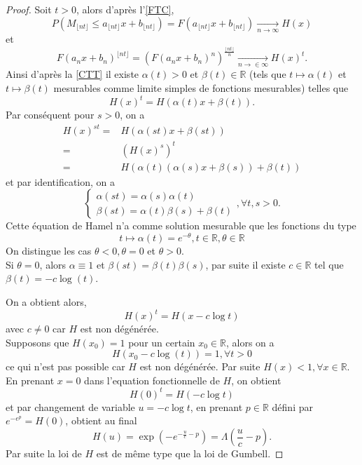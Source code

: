 \documentclass[10p,a4paper,reqno,titlepage]{report}
\newcommand{\R}{\mathbb{R}}
\theoremstyle{plain}
\theoremstyle{definition}
\begin{document}
\begin{proof}
	Soit $t >0$, alors d'après l'\autoref{FTC},
	$$P(M_{\lfloor nt \rfloor} \leq a_{\lfloor nt \rfloor} x + b_{\lfloor nt \rfloor}) = F(a_{\lfloor nt \rfloor} x + b_{\lfloor nt \rfloor}) \underset{n\to \infty}{\longrightarrow} H(x)$$
	et
	$$F(a_n x +b_n)^{\lfloor nt \rfloor} = \left( F(a_n x +b_n)^n\right)^{\frac{\lfloor nt \rfloor}{n}} \underset{n\to\in\infty}{\longrightarrow} H(x)^t.$$
	Ainsi d'après la \autoref{CTT} il existe $\alpha(t)>0$ et $\beta(t)\in\R$ (tels que $t \mapsto \alpha(t)$ et $t \mapsto \beta(t)$ mesurables comme limite simples de fonctions mesurables) telles que 
	$$ H(x)^t = H(\alpha(t)x +\beta(t)).$$
	Par conséquent pour $s>0$, on a 
	\begin{align*}
		H(x)^{st} = &  H(\alpha(st)x + \beta(st))\\
		= & (H(x)^s )^t \\
		= & H(\alpha(t)(\alpha(s)x +\beta(s))+\beta(t))
	\end{align*}
et par identification, on a 
$$\left\{ \begin{array}{l}
	\alpha(st) = \alpha(s)\alpha(t)\\
	\beta(st)= \alpha(t)\beta(s)+\beta(t)
\end{array}\right. ,\forall t,s >0.$$
Cette équation de Hamel n'a comme solution mesurable que les fonctions du type
$$ t \mapsto \alpha(t)= e^{-\theta}, t \in \R, \theta\in\R$$
On distingue les cas $\theta<0, \theta =0$ et $\theta >0$. \\
Si $\theta =0$, alors $\alpha \equiv 1$ et $\beta(st)=\beta(t)\beta(s)$, par suite il existe $c \in\R$ tel que $\beta(t)=- c \log(t)$.

On a obtient alors,
$$ H(x)^t = H(x -c\log t )$$
avec $c \neq 0$ car $H$ est non dégénérée. \\
Supposons que $H(x_0)= 1 $ pour un certain $x_0 \in \R$, alors on a 
 $$ H(x_0 - c\log(t))= 1 ,\forall t > 0$$
 ce qui n'est pas possible car $H$ est non dégénérée. Par suite $H(x) < 1,\forall x \in \R$.\\
 En prenant $x=0$ dans l'equation fonctionnelle de $H$, on obtient 
 $$ H(0)^t = H(- c\log t)$$
 et par changement de variable $u = - c\log t$, en prenant $p\in\R$ défini par $e^{-e ^p} =H(0)$, obtient au final
 $$H(u)= \exp(-e^{-\tfrac{u}{c}-p}) =\Lambda\left(\frac{u}{c}-p\right).$$
 Par suite la loi de $H$ est de même type que la loi de Gumbell.
\end{proof}
\end{document}
